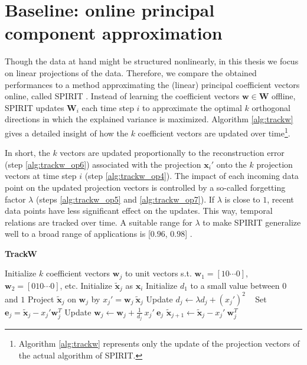 \newpage
\section{Baseline: online principal component approximation}
\label{sec:reconstruction_spirit}
Though the data at hand might be structured nonlinearly, in this thesis we focus on linear projections of the data. Therefore, we compare the obtained performances to a method approximating the (linear) principal coefficient vectors online, called SPIRIT \cite{papadimitriou2005streaming}. 
Instead of learning the coefficient vectors $\mathbf{w} \in \mathbf{W}$ offline, SPIRIT updates $\mathbf{W}_i$ each time step $i$ to approximate the optimal $k$ orthogonal directions in which the explained variance is maximized. Algorithm \ref{alg:trackw} gives a detailed insight of how the $k$ coefficient vectors are updated over time\footnote{Algorithm \ref{alg:trackw} represents only the update of the projection vectors of the actual algorithm of SPIRIT.}.

In short, the $k$ vectors are updated proportionally to the reconstruction error (step \ref{alg:trackw_op6}) associated with the projection $\mathbf{x}_i'$ onto the $k$ projection vectors at time step $i$ (step \ref{alg:trackw_op4}). The impact of each incoming data point on the updated projection vectors is controlled by a so-called forgetting factor $\lambda$ (steps \ref{alg:trackw_op5} and \ref{alg:trackw_op7}). If $\lambda$ is close to $1$, recent data points have less significant effect on the updates. This way, temporal relations are tracked over time. A suitable range for $\lambda$ to make SPIRIT generalize well to a broad range of applications is [$0.96$, $0.98$] \cite{papadimitriou2005streaming}. 

\begin{algorithm}[H]
	\caption{\quad \textbf{TrackW}}
	\label{alg:trackw}
	\begin{algorithmic}[1]
		\STATE Initialize $k$ coefficient vectors $\mathbf{w}_j$ to unit vectors s.t. $\mathbf{w}_1 = [10\cdots0]$, $\mathbf{w}_2 = [010\cdots0]$, etc. \label{alg:trackw_op1}
		\STATE Initialize $\tilde{\mathbf{x}}_j$ as $\mathbf{x}_i$ \label{alg:trackw_op2}
		\STATE Initialize $d_1$ to a small value between $0$ and $1$
		\label{alg:trackw_op3}
		\STATE Project $\tilde{\mathbf{x}}_j$ on $\mathbf{w}_j$ by $x_j' = \mathbf{w}_j \ \tilde{\mathbf{x}}_j$
		\label{alg:trackw_op4}
		\STATE Update $d_j \gets \lambda d_j + (x_j')^2$ \qquad\quad \ 
		\label{alg:trackw_op5}
		\STATE Set $\mathbf{e}_j = \tilde{\mathbf{x}}_j - x_j' \mathbf{w}_j^T $ 
		\label{alg:trackw_op6}
		\STATE Update $\mathbf{w}_j \gets \mathbf{w}_j + \frac{1}{d_j} \ x_j' \ \mathbf{e}_j$ \qquad {}
		\label{alg:trackw_op7}
		\STATE $\tilde{\mathbf{x}}_{j+1} \gets \tilde{\mathbf{x}}_j - x_j' \ \mathbf{w}_j^T$
		\label{alg:trackw_op8}
		\ENDFOR
	\end{algorithmic}
\end{algorithm}

